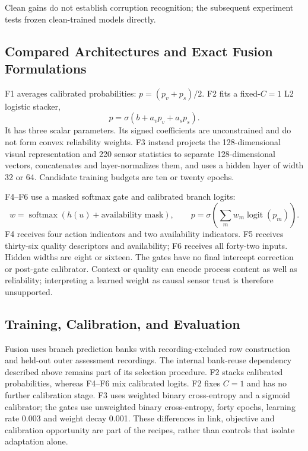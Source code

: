 Clean gains do not establish corruption recognition; the subsequent experiment tests frozen clean-trained models directly.

\subsection{Compared Architectures and Exact Fusion Formulations}
F1 averages calibrated probabilities: $p=(p_v+p_s)/2$. F2 fits a fixed-$C=1$ L2 logistic stacker,
\begin{equation}p=\sigma(b+a_vp_v+a_sp_s).\end{equation}
It has three scalar parameters. Its signed coefficients are unconstrained and do not form convex reliability weights. F3 instead projects the 128-dimensional visual representation and 220 sensor statistics to separate 128-dimensional vectors, concatenates and layer-normalizes them, and uses a hidden layer of width 32 or 64. Candidate training budgets are ten or twenty epochs.

F4--F6 use a masked softmax gate and calibrated branch logits:
\begin{equation}w=\operatorname{softmax}(h(u)+\text{availability mask}),\qquad p=\sigma\!\left(\sum_m w_m\operatorname{logit}(p_m)\right).\end{equation}
F4 receives four action indicators and two availability indicators. F5 receives thirty-six quality descriptors and availability; F6 receives all forty-two inputs. Hidden widths are eight or sixteen. The gates have no final intercept correction or post-gate calibrator. Context or quality can encode process content as well as reliability; interpreting a learned weight as causal sensor trust is therefore unsupported.

\subsection{Training, Calibration, and Evaluation}
Fusion uses branch prediction banks with recording-excluded row construction and held-out outer assessment recordings. The internal bank-reuse dependency described above remains part of its selection procedure. F2 stacks calibrated probabilities, whereas F4--F6 mix calibrated logits. F2 fixes $C=1$ and has no further calibration stage. F3 uses weighted binary cross-entropy and a sigmoid calibrator; the gates use unweighted binary cross-entropy, forty epochs, learning rate 0.003 and weight decay 0.001. These differences in link, objective and calibration opportunity are part of the recipes, rather than controls that isolate adaptation alone.

